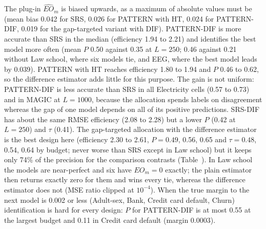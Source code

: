 The plug-in $\widehat{EO}_m$ is biased upwards, as a maximum of absolute values must be (mean bias 0.042 for SRS, 0.026 for PATTERN with HT, 0.024 for PATTERN-DIF, 0.019 for the gap-targeted variant with DIF). PATTERN-DIF is more accurate than SRS in the median (efficiency 1.94 to 2.21) and identifies the best model more often (mean $P$ 0.50 against 0.35 at $L=250$; 0.46 against 0.21 without Law school, where six models tie, and EEG, where the best model leads by 0.039). PATTERN with HT reaches efficiency 1.80 to 1.94 and $P$ 0.46 to 0.62, so the difference estimator adds little for this purpose. The gain is not uniform: PATTERN-DIF is less accurate than SRS in all Electricity cells (0.57 to 0.73) and in MAGIC at $L=1000$, because the allocation spends labels on disagreement whereas the gap of one model depends on all of its positive predictions. SRS-DIF has about the same RMSE efficiency (2.08 to 2.28) but a lower $P$ (0.42 at $L=250$) and $\tau$ (0.41). The gap-targeted allocation with the difference estimator is the best design here (efficiency 2.30 to 2.61, $P=0.49$, 0.56, 0.65 and $\tau=0.48$, 0.54, 0.64 by budget; never worse than SRS except in Law school) but it keeps only 74\% of the precision for the comparison contrasts (Table~). In Law school the models are near-perfect and six have $EO_m=0$ exactly; the plain estimator then returns exactly zero for them and wins every tie, whereas the difference estimator does not (MSE ratio clipped at $10^{-4}$). When the true margin to the next model is 0.002 or less (Adult-sex, Bank, Credit card default, Churn) identification is hard for every design: $P$ for PATTERN-DIF is at most 0.55 at the largest budget and 0.11 in Credit card default (margin 0.0003).

\begin{table}[t]
\centering\footnotesize
\setlength{\tabcolsep}{4pt}
\caption{Equalised-odds gap (A5). Eff.: median over cells of the median over models of $\mathrm{MSE}_{\mathrm{SRS}}/\mathrm{MSE}$ for $\widehat{EO}_m$ (cells in which both are exactly zero are skipped); $P$: mean probability that the estimated smallest-gap model has the smallest true gap; $\tau$: mean Kendall $\tau$ between estimated and true $EO_m$. DIF: totals from the difference estimator; plug-in: plain estimator.}
\label{tab:abl-eo}

\end{table}

